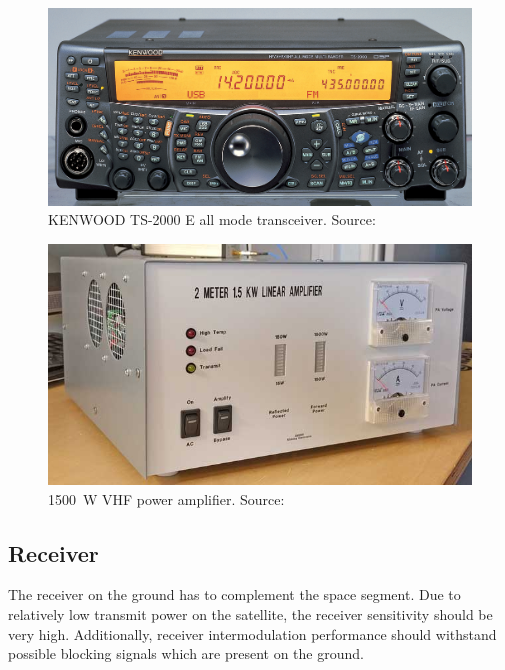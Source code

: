 \begin{minipage}{\linewidth}
    \centering
    \begin{minipage}{0.45\linewidth}
        \begin{figure}[H]
            \centering
            \includegraphics[width=0.35\paperwidth]{img/1/kenwood_ts2000.jpg}
            \caption{KENWOOD TS-2000 E all mode transceiver. Source: \cite{kenwood_ts2000}}
            \label{kenwood_ts2000}
        \end{figure}
    \end{minipage}
    \hspace{0.05\linewidth}
    \begin{minipage}{0.45\linewidth}
        \begin{figure}[H]
            \centering
            \includegraphics[width=0.35\paperwidth]{img/1/vhf_1500w_pa.jpg}
            \caption{\SI{1500}{\watt} VHF power amplifier. Source: \cite{vhf_1500w_pa}}
            \label{vhf_1500w_pa}
        \end{figure}
    \end{minipage}
\end{minipage}

\subsection{Receiver}
The receiver on the ground has to complement the space segment. Due to relatively low transmit power on the satellite, the receiver sensitivity should be very high. Additionally, receiver intermodulation performance should withstand possible blocking signals which are present on the ground.

